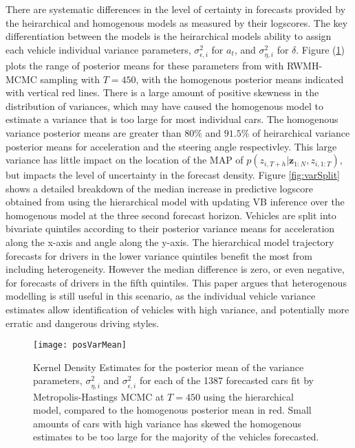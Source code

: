 \documentclass[12pt,a4paper]{article}\usepackage[]{graphicx}\usepackage[]{color}
\begin{document}
There are systematic differences in the level of certainty in forecasts provided by the heirarchical and homogenous models as measured by their logscores. The key differentiation between the models is the heirarchical models ability to assign each vehicle individual variance parameters,  $\sigma^2_{\epsilon, i}$ for $a_t$, and $\sigma^2_{\eta, i}$ for $\delta$. Figure (\ref{fig:posVarMean}) plots the range of posterior means for these parameters from with RWMH-MCMC sampling with $T = 450$, with the homogenous posterior means indicated with vertical red lines. There is a large amount of positive skewness in the distribution of variances, which may have caused the homogenous model to estimate a variance that is too large for most individual cars. The homogenous variance posterior means are greater than $80\%$ and $91.5\%$ of heirarchical variance posterior means for acceleration and the steering angle respectivley. This large variance has little impact on the location of the MAP of $p(z_{i, T+h} | \textbf{z}_{1:N}, z_{i, 1:T})$, but impacts the level of uncertainty in the forecast density. Figure \ref{fig:varSplit} shows a detailed breakdown of the median increase in predictive logscore obtained from using the hierarchical model with updating VB inference over the homogenous model at the three second forecast horizon. Vehicles are split into bivariate quintiles according to their posterior variance means for acceleration along the x-axis and angle along the y-axis. The hierarchical model trajectory forecasts for drivers in the lower variance quintiles benefit the most from including heterogeneity. However the median difference is zero, or even negative, for forecasts of drivers in the fifth quintiles. This paper argues that heterogenous modelling is still useful in this scenario, as the individual vehicle variance estimates allow identification of vehicles with high variance, and potentially more erratic and dangerous driving styles.
\\


\begin{figure}[ht]
\centering
\texttt{[image: posVarMean]}
\caption{Kernel Density Estimates for the posterior mean of the variance parameters, $\sigma^2_{\eta, i}$ and $\sigma^2_{\epsilon, i}$ for each of the 1387 forecasted cars fit by Metropolis-Hastings MCMC at $T = 450$ using the hierarchical model, compared to the homogenous posterior mean in red. Small amounts of cars with high variance has skewed the homogenous estimates to be too large for the majority of the vehicles forecasted.}
\label{fig:posVarMean}
\end{figure}
\end{document}
